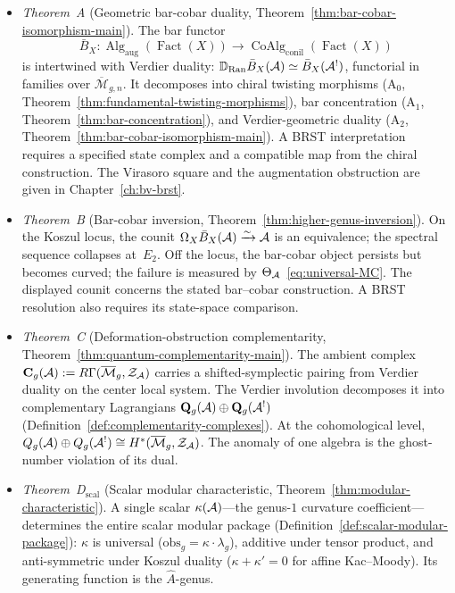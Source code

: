 \begin{itemize}
\item \emph{Theorem~A} (Geometric bar-cobar duality,
  Theorem~\ref{thm:bar-cobar-isomorphism-main}).
  The bar functor
  \[
  \bar{B}_X \colon
  \operatorname{Alg}_{\mathrm{aug}}(\operatorname{Fact}(X))
  \to \operatorname{CoAlg}_{\mathrm{conil}}(\operatorname{Fact}(X))
  \]
  is intertwined with Verdier duality:
  $\mathbb{D}_{\operatorname{Ran}} \bar{B}_X(\mathcal{A})
  \simeq \bar{B}_X(\mathcal{A}^!)$,
  functorial in families over $\overline{\mathcal{M}}_{g,n}$.
  It decomposes into chiral twisting morphisms
  ($\mathrm{A}_0$,
  Theorem~\ref{thm:fundamental-twisting-morphisms}),
  bar concentration
  ($\mathrm{A}_1$, Theorem~\ref{thm:bar-concentration}), and
  Verdier-geometric duality
  ($\mathrm{A}_2$,
  Theorem~\ref{thm:bar-cobar-isomorphism-main}).
  A BRST interpretation requires a specified state complex and a compatible map from the chiral construction.
  The Virasoro square and the augmentation obstruction are given in Chapter~\ref{ch:bv-brst}.

\item \emph{Theorem~B} (Bar-cobar inversion,
  Theorem~\ref{thm:higher-genus-inversion}).
  On the Koszul locus, the counit
  $\Omega_X \bar{B}_X(\mathcal{A}) \xrightarrow{\sim} \mathcal{A}$
  is an equivalence; the spectral sequence collapses at~$E_2$.
  Off the locus, the bar-cobar object persists but becomes curved;
  the failure is measured by
  $\Theta_{\mathcal{A}}$~\eqref{eq:universal-MC}.
  The displayed counit concerns the stated bar--cobar construction.
  A BRST resolution also requires its state-space comparison.

\item \emph{Theorem~C} (Deformation-obstruction complementarity,
  Theorem~\ref{thm:quantum-complementarity-main}).
  The ambient complex
  $\mathbf{C}_g(\mathcal{A}) := R\Gamma(\overline{\mathcal{M}}_g,
  \mathcal{Z}_{\mathcal{A}})$
  carries a shifted-symplectic pairing from Verdier duality on
  the center local system.  The Verdier involution decomposes it
  into complementary Lagrangians
  $\mathbf{Q}_g(\mathcal{A}) \oplus \mathbf{Q}_g(\mathcal{A}^!)$
  (Definition~\ref{def:complementarity-complexes}).
  At the cohomological level,
  $Q_g(\mathcal{A}) \oplus Q_g(\mathcal{A}^!) \cong
  H^*(\overline{\mathcal{M}}_g, \mathcal{Z}_{\mathcal{A}})$.
  The anomaly of one algebra is the ghost-number violation of
  its dual.

\item \emph{Theorem~D$_{\mathrm{scal}}$} (Scalar modular
  characteristic, Theorem~\ref{thm:modular-characteristic}).
  A single scalar $\kappa(\mathcal{A})$---the genus-$1$ curvature
  coefficient---determines the entire scalar modular package
  (Definition~\ref{def:scalar-modular-package}):
  $\kappa$ is universal
  ($\mathrm{obs}_g = \kappa \cdot \lambda_g$),
  additive under tensor product, and anti-symmetric under
  Koszul duality ($\kappa + \kappa' = 0$ for affine Kac--Moody).
  Its generating function is the $\hat{A}$-genus.


\end{itemize}
